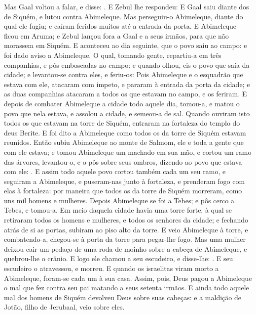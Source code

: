 {  Mas Gaal voltou a falar, e disse: .
  E Zebul lhe respondeu: 
  E Gaal saiu diante dos de Siquém, e lutou contra Abimeleque.
  Mas perseguiu-o Abimeleque, diante do qual ele fugiu; e caíram feridos muitos até a entrada da porta.
  E Abimeleque ficou em Aruma; e Zebul lançou fora a Gaal e a seus irmãos, para que não morassem em Siquém.
  E aconteceu ao dia seguinte, que o povo saiu ao campo: e foi dado aviso a Abimeleque.
  O qual, tomando gente, repartiu-a em três companhias, e pôs emboscadas no campo: e quando olhou, eis o povo que saía da cidade; e levantou-se contra eles, e feriu-os:
  Pois Abimeleque e o esquadrão que estava com ele, atacaram com ímpeto, e pararam à entrada da porta da cidade; e as duas companhias atacaram a todos os que estavam no campo, e os feriram.
  E depois de combater Abimeleque a cidade todo aquele dia, tomou-a, e matou o povo que nela estava, e assolou a cidade, e semeou-a de sal.
  Quando ouviram isto todos os que estavam na torre de Siquém, entraram na fortaleza do templo do deus Berite.
  E foi dito a Abimeleque como todos os da torre de Siquém estavam reunidos.
  Então subiu Abimeleque ao monte de Salmom, ele e toda a gente que com ele estava; e tomou Abimeleque um machado em sua mão, e cortou um ramo das árvores, levantou-o, e o pôs sobre seus ombros, dizendo ao povo que estava com ele: .
  E assim todo aquele povo cortou também cada um seu ramo, e seguiram a Abimeleque, e puseram-nas junto à fortaleza, e prenderam fogo com elas à fortaleza: por maneira que todos os da torre de Siquém morreram, como uns mil homens e mulheres.
  Depois Abimeleque se foi a Tebes; e pôs cerco a Tebes, e tomou-a.
  Em meio daquela cidade havia uma torre forte, à qual se retiraram todos os homens e mulheres, e todos os senhores da cidade; e fechando atrás de si as portas, subiram ao piso alto da torre.
  E veio Abimeleque à torre, e combatendo-a, chegou-se à porta da torre para pegar-lhe fogo.
  Mas uma mulher deixou cair um pedaço de uma roda de moinho sobre a cabeça de Abimeleque, e quebrou-lhe o crânio.
  E logo ele chamou a seu escudeiro, e disse-lhe: . E seu escudeiro o atravessou, e morreu.
  E quando os israelitas viram morto a Abimeleque, foram-se cada um à sua casa.
  Assim, pois, Deus pagou a Abimeleque o mal que fez contra seu pai matando a seus setenta irmãos.
  E ainda todo aquele mal dos homens de Siquém devolveu Deus sobre suas cabeças: e a maldição de Jotão, filho de Jerubaal, veio sobre eles.
\par }

